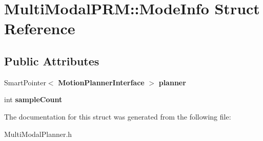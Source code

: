 \section{Multi\+Modal\+P\+RM\+:\+:Mode\+Info Struct Reference}
\label{structMultiModalPRM_1_1ModeInfo}
\subsection*{Public Attributes}
\begin{DoxyCompactItemize}
\item 
Smart\+Pointer$<$ {\bf Motion\+Planner\+Interface} $>$ {\bfseries planner}\label{structMultiModalPRM_1_1ModeInfo_aa66d0a3eb673317a855d6546df0dcd1e}

\item 
int {\bfseries sample\+Count}\label{structMultiModalPRM_1_1ModeInfo_afab8abd1d13f2b44d18ece6fe0016617}

\end{DoxyCompactItemize}


The documentation for this struct was generated from the following file\+:\begin{DoxyCompactItemize}
\item 
Multi\+Modal\+Planner.\+h\end{DoxyCompactItemize}

